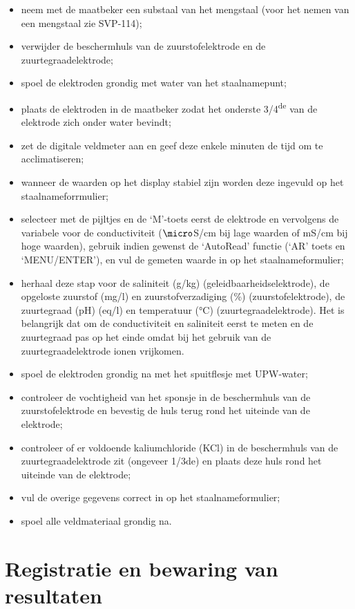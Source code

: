 \documentclass[
]{scrreprt}
\begin{document}
\begin{itemize}
\item
  neem met de maatbeker een substaal van het mengstaal (voor het nemen van een mengstaal zie SVP-114);
\item
  verwijder de beschermhuls van de zuurstofelektrode en de zuurtegraadelektrode;
\item
  spoel de elektroden grondig met water van het staalnamepunt;
\item
  plaats de elektroden in de maatbeker zodat het onderste 3/4\textsuperscript{de} van de elektrode zich onder water bevindt;
\item
  zet de digitale veldmeter aan en geef deze enkele minuten de tijd om te acclimatiseren;
\item
  wanneer de waarden op het display stabiel zijn worden deze ingevuld op het staalnameforrmulier;
\item
  selecteer met de pijltjes en de `M'-toets eerst de elektrode en vervolgens de variabele voor de conductiviteit (\(\micro\)S/cm bij lage waarden of mS/cm bij hoge waarden), gebruik indien gewenst de `AutoRead' functie (`AR' toets en `MENU/ENTER'), en vul de gemeten waarde in op het staalnameformulier;
\item
  herhaal deze stap voor de saliniteit (g/kg) (geleidbaarheidselektrode), de opgeloste zuurstof (mg/l) en zuurstofverzadiging (\%) (zuurstofelektrode), de zuurtegraad (pH) (eq/l) en temperatuur (°C) (zuurtegraadelektrode).
  Het is belangrijk dat om de conductiviteit en saliniteit eerst te meten en de zuurtegraad pas op het einde omdat bij het gebruik van de zuurtegraadelektrode ionen vrijkomen.
\item
  spoel de elektroden grondig na met het spuitflesje met UPW-water;
\item
  controleer de vochtigheid van het sponsje in de beschermhuls van de zuurstofelektrode en bevestig de huls terug rond het uiteinde van de elektrode;
\item
  controleer of er voldoende kaliumchloride (KCl) in de beschermhuls van de zuurtegraadelektrode zit (ongeveer 1/3de) en plaats deze huls rond het uiteinde van de elektrode;
\item
  vul de overige gegevens correct in op het staalnameformulier;
\item
  spoel alle veldmateriaal grondig na.
\end{itemize}

\hypertarget{registratie-en-bewaring-van-resultaten}{%
\section{Registratie en bewaring van resultaten}\label{registratie-en-bewaring-van-resultaten}}
\end{document}
